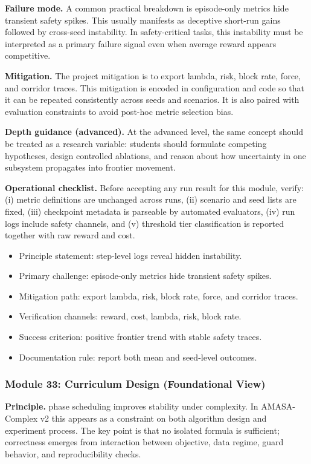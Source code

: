 \documentclass[conference]{IEEEtran}
\begin{document}
\textbf{Failure mode.} A common practical breakdown is episode-only metrics hide transient safety spikes. This usually manifests as deceptive short-run gains followed by cross-seed instability. In safety-critical tasks, this instability must be interpreted as a primary failure signal even when average reward appears competitive.

\textbf{Mitigation.} The project mitigation is to export lambda, risk, block rate, force, and corridor traces. This mitigation is encoded in configuration and code so that it can be repeated consistently across seeds and scenarios. It is also paired with evaluation constraints to avoid post-hoc metric selection bias.

\textbf{Depth guidance (advanced).} At the advanced level, the same concept should be treated as a research variable: students should formulate competing hypotheses, design controlled ablations, and reason about how uncertainty in one subsystem propagates into frontier movement.

\textbf{Operational checklist.} Before accepting any run result for this module, verify: (i) metric definitions are unchanged across runs, (ii) scenario and seed lists are fixed, (iii) checkpoint metadata is parseable by automated evaluators, (iv) run logs include safety channels, and (v) threshold tier classification is reported together with raw reward and cost.

\begin{itemize}[leftmargin=*]
  \item Principle statement: step-level logs reveal hidden instability.
  \item Primary challenge: episode-only metrics hide transient safety spikes.
  \item Mitigation path: export lambda, risk, block rate, force, and corridor traces.
  \item Verification channels: reward, cost, lambda, risk, block rate.
  \item Success criterion: positive frontier trend with stable safety traces.
  \item Documentation rule: report both mean and seed-level outcomes.
\end{itemize}


\subsubsection{Module 33: Curriculum Design (Foundational View)}
\textbf{Principle.} phase scheduling improves stability under complexity. In AMASA-Complex v2 this appears as a constraint on both algorithm design and experiment process. The key point is that no isolated formula is sufficient; correctness emerges from interaction between objective, data regime, guard behavior, and reproducibility checks.
\end{document}
